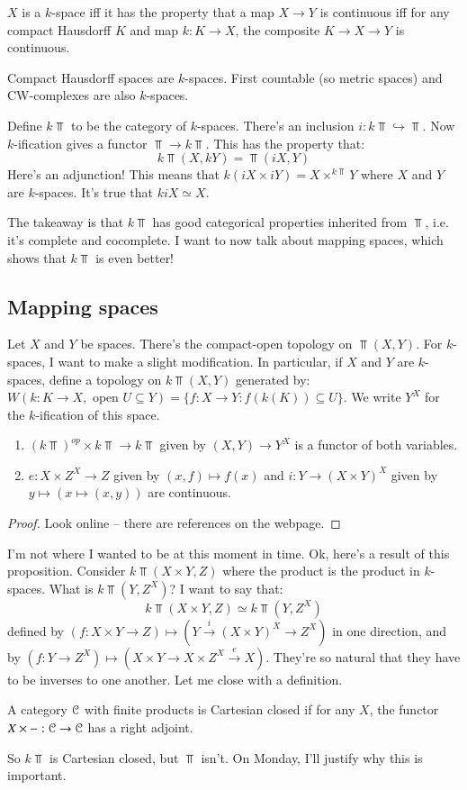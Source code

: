 \begin{remark}
    $X$ is a $k$-space iff it has the property that a map $X\to Y$ is continuous iff for any compact Hausdorff $K$ and map $k:K\to X$, the composite $K\to X\to Y$ is continuous.
\end{remark}
\begin{example}
    Compact Hausdorff spaces are $k$-spaces. First countable (so metric spaces) and CW-complexes are also $k$-spaces.
\end{example}
Define $k\Top$ to be the category of $k$-spaces. There's an inclusion $i:k\Top\hookrightarrow \Top$. Now $k$-ification gives a functor $\Top\to k\Top$. This has the property that:
$$k\Top(X,kY)=\Top(iX,Y)$$
Here's an adjunction! This means that $k(iX\times iY)=X\times^{k\Top}Y$ where $X$ and $Y$ are $k$-spaces. It's true that $kiX\simeq X$.

The takeaway is that $k\Top$ has good categorical properties inherited from $\Top$, i.e. it's complete and cocomplete. I want to now talk about mapping spaces, which shows that $k\Top$ is even better!
\subsection{Mapping spaces}
Let $X$ and $Y$ be spaces. There's the compact-open topology on $\Top(X,Y)$. For $k$-spaces, I want to make a slight modification. In particular, if $X$ and $Y$ are $k$-spaces, define a topology on $k\Top(X,Y)$ generated by: $W(k:K\to X, \text{ open }U\subseteq Y)=\{f:X\to Y: f(k(K))\subseteq U\}$. We write $Y^X$ for the $k$-ification of this space.
\begin{prop}
    \begin{enumerate}
	\item $(k\Top)^{op}\times k\Top\to k\Top$ given by $(X,Y)\to Y^X$ is a functor of both variables.
	\item $e:X\times Z^X\to Z$ given by $(x,f)\mapsto f(x)$ and $i:Y\to (X\times Y)^X$ given by $y\mapsto(x\mapsto(x,y))$ are continuous.
    \end{enumerate}
\end{prop}
\begin{proof}
    Look online -- there are references on the webpage.
\end{proof}
I'm not where I wanted to be at this moment in time. Ok, here's a result of this proposition. Consider $k\Top(X\times Y,Z)$ where the product is the product in $k$-spaces. What is $k\Top(Y,Z^X)$? I want to say that:
$$k\Top(X\times Y,Z)\simeq k\Top(Y,Z^X)$$
defined by $(f:X\times Y\to Z)\mapsto (Y\xrightarrow{i}(X\times Y)^X\to Z^X)$ in one direction, and by $(f:Y\to Z^X)\mapsto(X\times Y\to X\times Z^X\xrightarrow{e} X)$. They're so natural that they have to be inverses to one another. Let me close with a definition.
\begin{definition}
    A category $\mathcal C$ with finite products is Cartesian closed if for any $X$, the functor $X\times -:\mathcal C\to \mathcal C$ has a right adjoint.
\end{definition}
So $k\Top$ is Cartesian closed, but $\Top$ isn't. On Monday, I'll justify why this is important.
